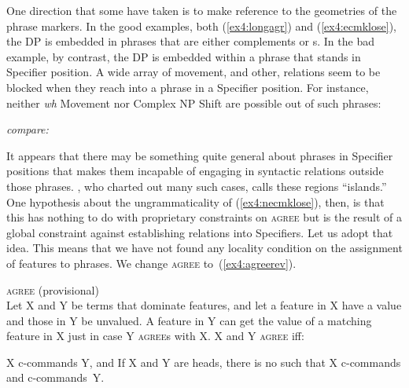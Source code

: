 One direction that some have taken is to make reference to the geometries of the phrase markers. In the good examples, both (\ref{ex4:longagr}) and (\ref{ex4:ecmklose}), the DP is embedded in phrases that are either complements or s. In the bad example, by contrast, the DP is embedded within a phrase that stands in Specifier position. A wide array of movement, and other, relations seem to be blocked when they reach into a phrase in a Specifier position. For instance, neither \emph{wh} Movement nor Complex NP Shift are possible out of such phrases:
\pagebreak
\begin{exe}
\ex \label{ex4:subjcon}
\begin{xlist}
	\sn \emph{compare:}
\end{xlist}
\end{exe}
It appears that there may be something quite general about phrases in Specifier positions that makes them incapable of engaging in syntactic relations outside those phrases. \citet{Ross:1967}, who charted out many such cases, calls these regions ``islands.'' One hypothesis about the ungrammaticality of (\ref{ex4:necmklose}), then, is that this has nothing to do with proprietary constraints on \textsc{agree} but is the result of a global constraint against establishing relations into Specifiers. Let us adopt that idea. This means that we have not found any locality condition on the assignment of features to phrases. We change \textsc{agree} to~(\ref{ex4:agreerev}).
\begin{exe}
\ex \label{ex4:agreerev} \textsc{agree} (provisional)\\
 Let X and Y be terms that dominate features, and let a feature in X have a value and those in Y be unvalued. A feature in Y can get the value of a matching feature in X just in case Y \textsc{agree}s with X. X and Y \textsc{agree} iff:
\begin{xlist}
	\ex X c-commands Y, and
	\ex If X and Y are heads, there is no  such that X c-commands  and  c-commands~Y.
\end{xlist}
\end{exe}

